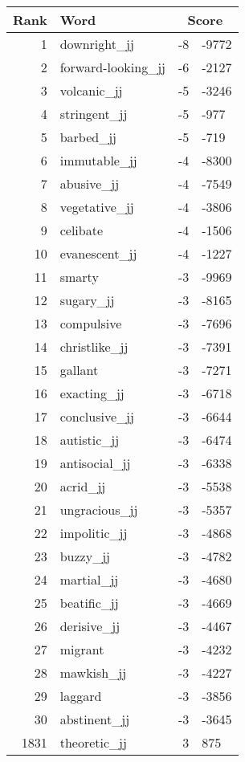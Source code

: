 \begin{longtable}[!htbp]{| rlr@{.}l |}
    \hline
    \textbf{Rank} & \textbf{Word} & \multicolumn{2}{c|}{\textbf{Score}} \\
    \hline
    \endhead
    1 & downright\_jj & -8 & -9772 \\
    2 & forward-looking\_jj & -6 & -2127 \\
    3 & volcanic\_jj & -5 & -3246 \\
    4 & stringent\_jj & -5 & -977 \\
    5 & barbed\_jj & -5 & -719 \\
    6 & immutable\_jj & -4 & -8300 \\
    7 & abusive\_jj & -4 & -7549 \\
    8 & vegetative\_jj & -4 & -3806 \\
    9 & celibate & -4 & -1506 \\
    10 & evanescent\_jj & -4 & -1227 \\
    11 & smarty & -3 & -9969 \\
    12 & sugary\_jj & -3 & -8165 \\
    13 & compulsive & -3 & -7696 \\
    14 & christlike\_jj & -3 & -7391 \\
    15 & gallant & -3 & -7271 \\
    16 & exacting\_jj & -3 & -6718 \\
    17 & conclusive\_jj & -3 & -6644 \\
    18 & autistic\_jj & -3 & -6474 \\
    19 & antisocial\_jj & -3 & -6338 \\
    20 & acrid\_jj & -3 & -5538 \\
    21 & ungracious\_jj & -3 & -5357 \\
    22 & impolitic\_jj & -3 & -4868 \\
    23 & buzzy\_jj & -3 & -4782 \\
    24 & martial\_jj & -3 & -4680 \\
    25 & beatific\_jj & -3 & -4669 \\
    26 & derisive\_jj & -3 & -4467 \\
    27 & migrant & -3 & -4232 \\
    28 & mawkish\_jj & -3 & -4227 \\
    29 & laggard & -3 & -3856 \\
    30 & abstinent\_jj & -3 & -3645 \\
    1831 & theoretic\_jj & 3 & 875 \\

\end{longtable}
